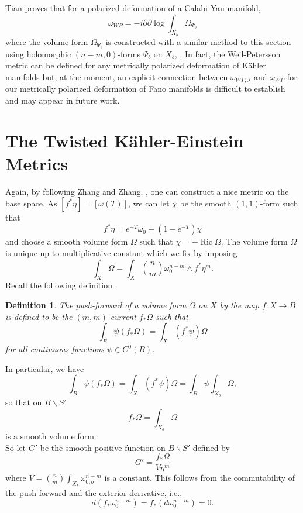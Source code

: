 \documentclass[12pt]{article}
\newtheorem{definition}[theorem]{Definition}
\numberwithin{equation}{section}
\renewcommand{\d}{\partial}
\newcommand{\dbar}{\overline{\partial}}
\DeclareMathOperator{\Ric}{Ric}
\begin{document}
Tian proves that for a polarized deformation of a Calabi-Yau manifold,
\begin{equation*}
    \omega_{WP} = -i\d\dbar \log \int_{X_b} \Omega_{\Psi_b}
\end{equation*}
where the volume form $\Omega_{\Psi_b}$ is constructed with a similar method to this section using holomorphic $(n-m,0)$-forms $\Psi_b$ on $X_b$, \cite[Thm. 2]{T87}. In fact, the Weil-Petersson metric can be defined for any metrically polarized deformation of K\"ahler manifolds but, at the moment, an explicit connection between $\omega_{WP,\lambda}$ and $\omega_{WP}$ for our metrically polarized deformation of Fano manifolds is difficult to establish and may appear in future work.

\section{The Twisted K\"ahler-Einstein Metrics}

\noindent Again, by following Zhang and Zhang, \cite{ZZ20}, one can construct a nice metric on the base space. As $[f^*\eta] = [\omega(T)]$, we can let $\chi$ be the smooth $(1,1)$-form such that
\begin{equation}\label{choice_of_Omega}
    f^*\eta = e^{-T} \omega_0 + (1-e^{-T}) \chi
\end{equation}
and choose a smooth volume form $\Omega$ such that $\chi = -\Ric \Omega$. The volume form $\Omega$ is unique up to multiplicative constant which we fix by imposing
\begin{equation*}
    \int_X \Omega =  \int_X {n\choose m} \omega_0^{n-m} \wedge f^*\eta^m.
\end{equation*}
Recall the following definition \cite[Defn. 3.1]{ST12}.

\begin{definition}
The push-forward of a volume form $\Omega$ on $X$ by the map $f: X \to B$ is defined to be the $(m,m)$-current $f_* \Omega$ such that
\begin{equation*}
    \int_B \psi(f_* \Omega) = \int_X (f^*\psi) \Omega
\end{equation*}
for all continuous functions $\psi \in C^0(B)$.
\end{definition}
\noindent In particular, we have
\begin{equation*}
    \int_B \psi (f_*\Omega) = \int_X (f^*\psi) \Omega = \int_B \psi \int_{X_b}\Omega,
\end{equation*}
so that on $B\backslash S'$
\begin{equation*}
    f_*\Omega = \int_{X_b} \Omega
\end{equation*}
is a smooth volume form.\\
So let $G'$ be the smooth positive function on $B\backslash S'$ defined by
\begin{equation*}
    G' = \frac{f_* \Omega}{V\eta^m}
\end{equation*}
where $V = {n\choose m} \int_{X_b} \omega_{0,b}^{n-m}$ is a constant. This follows from the commutability of the push-forward and the exterior derivative, i.e.,
\begin{equation*}
    d(f_*\omega_{0}^{n-m}) = f_*(d \omega_{0}^{n-m}) = 0.
\end{equation*}
\end{document}

